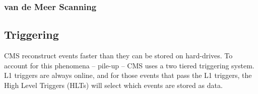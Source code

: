 \subsubsection{van de Meer Scanning}

\subsection{Triggering}

CMS reconstruct events faster than they can be stored on hard-drives. To account for this phenomena -- pile-up -- CMS uses a two tiered triggering system. L1 triggers are always online, and for those events that pass the L1 triggers, the High Level Triggers (HLTs) will select which events are stored as data.